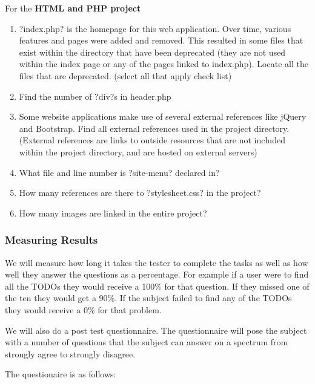 \documentclass[letterpaper,10pt,titlepage,draftclsnofoot,onecolumn,onesided] {IEEEtran}
\begin{document}
	For the \textbf{HTML and PHP project}
	\begin{enumerate}
		\item ?index.php? is the homepage for this web application. Over time, various features and pages were added and removed. This resulted in some files that exist within the directory that have been deprecated (they are not used within the index page or any of the pages linked to index.php). Locate all the files that are deprecated. (select all that apply check list)
		\item Find the number of ?div?s in header.php
		\item Some website applications make use of several external references like jQuery and Bootstrap. Find all external references used in the project directory. (External references are links to outside resources that are not included within the project directory, and are hosted on external servers)
		\item What file and line number is ?site-menu? declared in?
		\item How many references are there to ?stylesheet.css? in the project?
		\item How many images are linked in the entire project?
	\end{enumerate}
	
	\subsubsection{Measuring Results}
	We will measure how long it takes the tester to complete the tasks as well as how well they answer the questions as a percentage. 
	For example if a user were to find all the TODOs they would receive a 100\% for that question. 
	If they missed one of the ten they would get a 90\%.
	If the subject failed to find any of the TODOs they would receive a 0\% for that problem.

	We will also do a post test questionnaire. 
	The questionnaire will pose the subject with a number of questions that the subject can answer on a spectrum from strongly agree to strongly disagree.

	The questionaire is as follows: 
	
\end{document}
